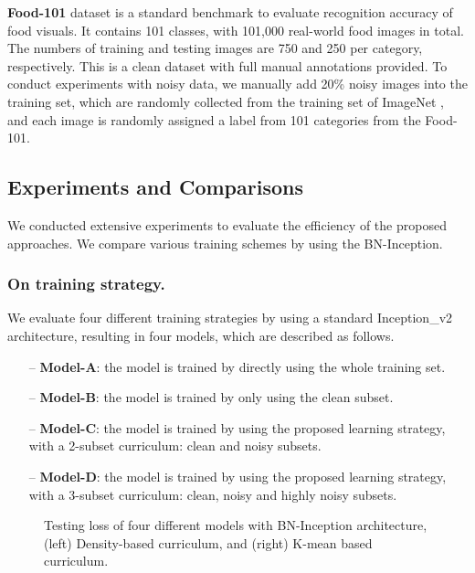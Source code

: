 \documentclass[runningheads]{llncs}
\begin{document}
\noindent \textbf{Food-101} dataset \cite{bossard2014food} is a standard benchmark to evaluate recognition accuracy of food visuals. It contains 101 classes, with 101,000 real-world food images in total. The numbers of training and testing images are 750 and 250 per category, respectively. This is a clean dataset with full manual annotations provided. To conduct experiments with noisy data, we manually add 20\% noisy images into the training set, which are randomly collected from the training set of ImageNet \cite{DengDSLL009}, and each image is randomly assigned a label from 101 categories from the Food-101.

\subsection{Experiments and Comparisons}
We conducted extensive experiments to evaluate the efficiency of the proposed approaches. We compare various training schemes by using the BN-Inception. 


\subsubsection{On training strategy.}
 We evaluate four different training strategies by using a standard Inception\_v2 architecture, resulting in four models, which are described as follows.
\begin{itemize}
\item[--] \textbf{Model-A}: the model is trained by directly using the whole training set.
\item[--] \textbf{Model-B}: the model is trained by only using the clean subset.
\item[--] \textbf{Model-C}: the model is trained by using the proposed learning strategy, with a 2-subset curriculum: clean and noisy subsets.
\item[--] \textbf{Model-D}: the model is trained by using the proposed learning strategy, with a 3-subset curriculum: clean, noisy and highly noisy subsets.
\end{itemize}

\begin{figure*}[tb]
\centering
{}
\vspace{-5mm}
\caption{Testing loss of four different models with BN-Inception architecture, (left) Density-based curriculum, and (right) K-mean based curriculum.}
\label{fig:testloss}
\end{figure*}
\end{document}
